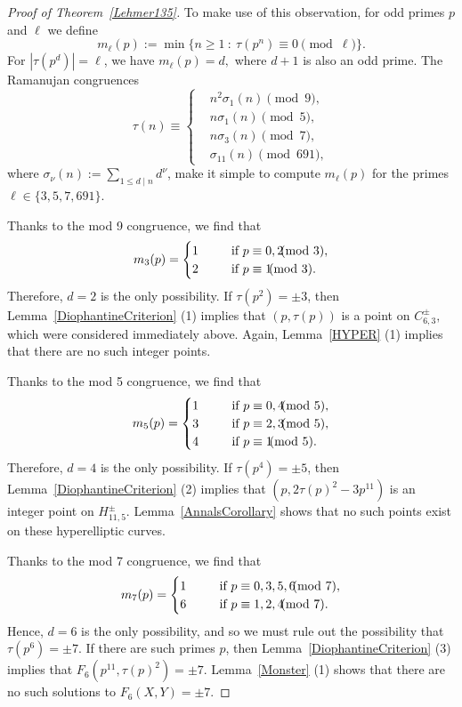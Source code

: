 \documentclass[12pt]{amsart}
\newcommand{\?}{\color{red}?}
\numberwithin{equation}{section}
\begin{document}
\begin{proof}[Proof of Theorem~\ref{Lehmer135}]
To make use of this observation, for odd primes 
$p$ and $\ell$ we define
\begin{equation}
m_{\ell}(p):=\min\{ n\geq 1\ : \ \tau(p^n)\equiv 0\!\!\!\!\pmod{\ell}\}.
\end{equation}
For $|\tau(p^d)|=\ell$, we have $m_{\ell}(p)=d,$ where $d+1$ is also an odd prime.
The Ramanujan congruences \cite{RamanujanUnpublished, Ramanujan, SerreRamanujan}
\begin{displaymath}
\tau(n)\equiv \begin{cases} &n^2\sigma_1(n)\pmod 9,\\
 &n\sigma_1(n)\pmod 5,\\
&n\sigma_3(n)\pmod 7,\\
&\sigma_{11}(n)\pmod{691},
\end{cases}
\end{displaymath}
where $\sigma_{\nu}(n):=\sum_{1\leq d\mid n}d^{\nu}$, make it simple to compute $m_{\ell}(p)$
for the primes $\ell \in \{3, 5, 7, 691\}.$

Thanks to the mod 9 congruence, we find that
$$
m_3(p)=\begin{cases} 1 \ \ \ \ \ &{\text {\rm if }} p\equiv 0, 2\!\!\!\!\pmod 3,\\
2\ \ \ \ \ &{\text {\rm if }} p\equiv 1\!\!\!\!\pmod 3.
\end{cases}
$$
Therefore, $d=2$ is the only possibility.
If $\tau(p^2)=\pm 3$, then Lemma~\ref{DiophantineCriterion} (1) implies that
 $(p,\tau(p))$ is a point on $C^{\pm}_{6,3},$ which were considered immediately above.
Again,  Lemma~\ref{HYPER} (1) implies that there are no such integer points.
 
Thanks to the mod 5 congruence, we find that
$$
m_5(p)=\begin{cases} 1 \ \ \ \ \ &{\text {\rm if }} p\equiv 0, 4\!\!\!\!\pmod{5},\\
3 \ \ \ \ \ &{\text {\rm if }} p\equiv 2, 3\!\!\!\!\pmod{5},\\
4 \ \ \ \ \ &{\text {\rm if }} p\equiv 1\!\!\!\!\pmod{5}.
\end{cases}
$$
Therefore, $d=4$ is the only possibility.
If $\tau(p^4)=\pm 5$, then Lemma~\ref{DiophantineCriterion} (2) implies that
 $(p, 2\tau(p)^2-3p^{11})$ is an integer point on $H^{\pm}_{11,5}.$
Lemma~\ref{AnnalsCorollary} shows that no such points exist on these hyperelliptic curves.

Thanks to the mod 7 congruence, we find that
$$
m_7(p)=\begin{cases}
1 \ \ \ \ \ &{\text {\rm if }} p\equiv 0, 3, 5, 6\!\!\!\!\pmod{7},\\
6 \ \ \ \ \ &{\text {\rm if }} p\equiv 1, 2, 4\!\!\!\!\pmod{7}.
\end{cases}
$$
Hence, $d=6$ is the only possibility, and so we must rule out the possibility that $\tau(p^6)=\pm 7$.
If there are such primes $p$, then Lemma~\ref{DiophantineCriterion} (3) implies
 that
$F_{6}(p^{11},\tau(p)^2)=\pm 7.$
Lemma~\ref{Monster} (1) shows that there are no such solutions to $F_6(X,Y)=\pm 7.$



\end{proof}
\end{document}
